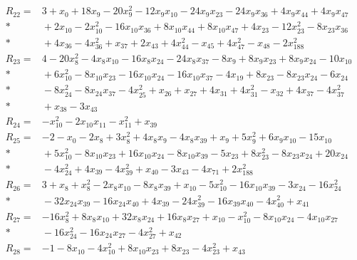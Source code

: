 \documentclass[11pt]{article}
\theoremstyle{remark}\newtheorem{remark}[theorem]{Remark}
\begin{document}
\begin{align*}
R_{22} ={}& 3 + x_{0} + 18x_{9} - 20x_{9}^{2} - 12x_{9}x_{10} - 24x_{9}x_{23} - 24x_{9}x_{36} + 4x_{9}x_{44} + 4x_{9}x_{47} \\*
&{} + 2x_{10} - 2x_{10}^{2} - 16x_{10}x_{36} + 8x_{10}x_{44} + 8x_{10}x_{47} + 4x_{23} - 12x_{23}^{2} - 8x_{23}x_{36} \\*
&{} + 4x_{36} - 4x_{36}^{2} + x_{37} + 2x_{43} + 4x_{44}^{2} - x_{45} + 4x_{47}^{2} - x_{48} - 2x_{188}^{2} \\[4pt]
R_{23} ={}& 4 - 20x_{8}^{2} - 4x_{8}x_{10} - 16x_{8}x_{24} - 24x_{8}x_{37} - 8x_{9} + 8x_{9}x_{23} + 8x_{9}x_{24} - 10x_{10} \\*
&{} + 6x_{10}^{2} - 8x_{10}x_{23} - 16x_{10}x_{24} - 16x_{10}x_{37} - 4x_{19} + 8x_{23} - 8x_{23}x_{24} - 6x_{24} \\*
&{} - 8x_{24}^{2} - 8x_{24}x_{37} - 4x_{25}^{2} + x_{26} + x_{27} + 4x_{31} + 4x_{31}^{2} - x_{32} + 4x_{37} - 4x_{37}^{2} \\*
&{} + x_{38} - 3x_{43} \\[4pt]
R_{24} ={}& -x_{10}^{2} - 2x_{10}x_{11} - x_{11}^{2} + x_{39} \\[4pt]
R_{25} ={}& -2 - x_{0} - 2x_{8} + 3x_{8}^{2} + 4x_{8}x_{9} - 4x_{8}x_{39} + x_{9} + 5x_{9}^{2} + 6x_{9}x_{10} - 15x_{10} \\*
&{} + 5x_{10}^{2} - 8x_{10}x_{23} + 16x_{10}x_{24} - 8x_{10}x_{39} - 5x_{23} + 8x_{23}^{2} - 8x_{23}x_{24} + 20x_{24} \\*
&{} - 4x_{24}^{2} + 4x_{39} - 4x_{39}^{2} + x_{40} - 3x_{43} - 4x_{71} + 2x_{188}^{2} \\[4pt]
R_{26} ={}& 3 + x_{8} + x_{8}^{2} - 2x_{8}x_{10} - 8x_{8}x_{39} + x_{10} - 5x_{10}^{2} - 16x_{10}x_{39} - 3x_{24} - 16x_{24}^{2} \\*
&{} - 32x_{24}x_{39} - 16x_{24}x_{40} + 4x_{39} - 24x_{39}^{2} - 16x_{39}x_{40} - 4x_{40}^{2} + x_{41} \\[4pt]
R_{27} ={}& -16x_{8}^{2} + 8x_{8}x_{10} + 32x_{8}x_{24} + 16x_{8}x_{27} + x_{10} - x_{10}^{2} - 8x_{10}x_{24} - 4x_{10}x_{27} \\*
&{} - 16x_{24}^{2} - 16x_{24}x_{27} - 4x_{27}^{2} + x_{42} \\[4pt]
R_{28} ={}& -1 - 8x_{10} - 4x_{10}^{2} + 8x_{10}x_{23} + 8x_{23} - 4x_{23}^{2} + x_{43} \\[4pt]

\end{align*}
\end{document}
